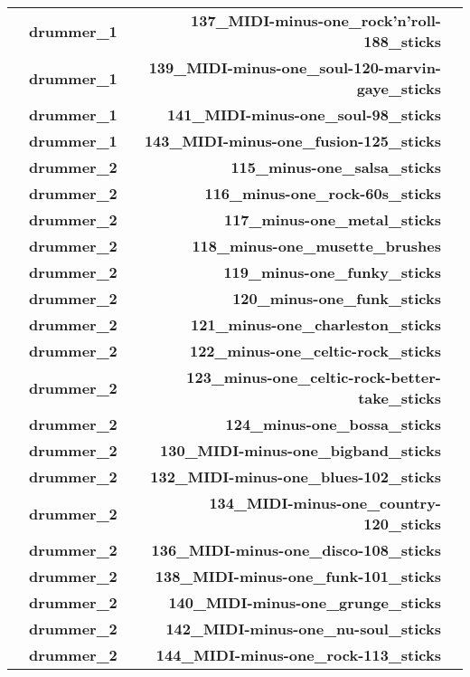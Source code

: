 \begin{tabularx}{\linewidth}{l|lrX}
        & \textbf{drummer\_1} & \textbf{137\_MIDI-minus-one\_rock'n'roll-188\_sticks} \\
        & \textbf{drummer\_1} & \textbf{139\_MIDI-minus-one\_soul-120-marvin-gaye\_sticks} \\
        & \textbf{drummer\_1} & \textbf{141\_MIDI-minus-one\_soul-98\_sticks} \\
        & \textbf{drummer\_1} & \textbf{143\_MIDI-minus-one\_fusion-125\_sticks} \\
        & \textbf{drummer\_2} & \textbf{115\_minus-one\_salsa\_sticks} \\
        & \textbf{drummer\_2} & \textbf{116\_minus-one\_rock-60s\_sticks} \\
        & \textbf{drummer\_2} & \textbf{117\_minus-one\_metal\_sticks} \\
        & \textbf{drummer\_2} & \textbf{118\_minus-one\_musette\_brushes} \\
        & \textbf{drummer\_2} & \textbf{119\_minus-one\_funky\_sticks} \\
        & \textbf{drummer\_2} & \textbf{120\_minus-one\_funk\_sticks} \\
        & \textbf{drummer\_2} & \textbf{121\_minus-one\_charleston\_sticks} \\
        & \textbf{drummer\_2} & \textbf{122\_minus-one\_celtic-rock\_sticks} \\
        & \textbf{drummer\_2} & \textbf{123\_minus-one\_celtic-rock-better-take\_sticks} \\
        & \textbf{drummer\_2} & \textbf{124\_minus-one\_bossa\_sticks} \\
        & \textbf{drummer\_2} & \textbf{130\_MIDI-minus-one\_bigband\_sticks} \\
        & \textbf{drummer\_2} & \textbf{132\_MIDI-minus-one\_blues-102\_sticks} \\
        & \textbf{drummer\_2} & \textbf{134\_MIDI-minus-one\_country-120\_sticks} \\
        & \textbf{drummer\_2} & \textbf{136\_MIDI-minus-one\_disco-108\_sticks} \\
        & \textbf{drummer\_2} & \textbf{138\_MIDI-minus-one\_funk-101\_sticks} \\
        & \textbf{drummer\_2} & \textbf{140\_MIDI-minus-one\_grunge\_sticks} \\
        & \textbf{drummer\_2} & \textbf{142\_MIDI-minus-one\_nu-soul\_sticks} \\
        & \textbf{drummer\_2} & \textbf{144\_MIDI-minus-one\_rock-113\_sticks} \\

\end{tabularx}

